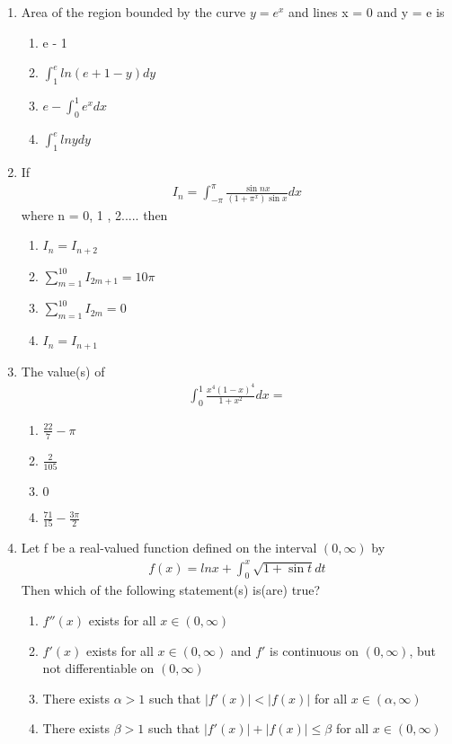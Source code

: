 \begin{enumerate}[label=\arabic*.,ref=\thesubsection.\theenumi]
\item Area of the region bounded by the curve $y = e^x$ and lines x = 0 and y = e is
\begin{enumerate}
\item e - 1
\item $\int_{1}^{e}ln(e + 1 - y)dy$
\item $e - \int_{0}^{1}e^xdx$
\item $\int_{1}^{e}ln ydy$
\end{enumerate}

\item If 
\begin{align*}
I_n = \int_{-\pi}^{\pi}\frac{\sin nx}{(1 + \pi^{x})\sin x}dx
\end{align*}
where n = 0, 1 , 2..... then
\begin{enumerate}
\item $I_n = I_{n + 2}$
\item $\sum_{m = 1}^{10}I_{2m + 1} = 10\pi$
\item $\sum_{m = 1}^{10}I_{2m} = 0$
\item $I_n = I_{n + 1}$
\end{enumerate} 

\item The value(s) of
\begin{align*}
\int_{0}^{1}\frac{x^4(1 - x)^4}{1 + x^2}dx = 
\end{align*}
\begin{enumerate}
\item $\frac{22}{7} - \pi$
\item $\frac{2}{105}$
\item $0$
\item $\frac{71}{15} - \frac{3\pi}{2}$
\end{enumerate}

\item Let f be a real-valued function defined on the interval $(0, \infty)$ by 
\begin{align*}
f(x) = lnx + \int_{0}^{x}\sqrt{1 + \sin t}dt
\end{align*}
Then which of the following statement(s) is(are) true?
\begin{enumerate}
\item $f''(x)$ exists for all $x \in (0, \infty)$
\item $f'(x)$ exists for all $x \in (0, \infty)$ and $f'$ is continuous on $(0, \infty)$, but not differentiable on $(0, \infty)$
\item There exists $\alpha > 1$ such that $|f'(x)| < |f(x)|$ for all $x \in (\alpha, \infty)$
\item There exists $\beta > 1$ such that $|f'(x)| + |f(x)| \leq \beta$ for all $x \in (0, \infty)$
\end{enumerate}


\end{enumerate}
